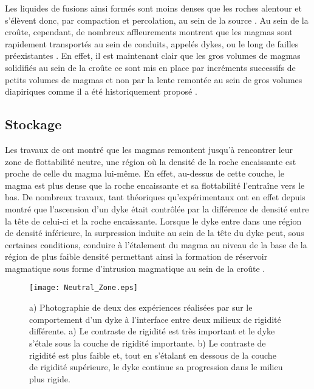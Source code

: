Les liquides de fusions ainsi formés sont moins denses que les roches
alentour et s'élèvent donc, par compaction et percolation, au sein de
la source \citep{McKenzy:1984bo,McKenzie:1985jq}. Au sein de la
croûte, cependant, de nombreux affleurements montrent que les magmas
sont rapidement transportés au sein de conduits, appelés dykes, ou le
long de failles préexistantes
\citep{Clemens:1992kr,Petford:1993bk,Rubin:1995upa,Glazner:2004gv}. En
effet, il est maintenant clair que les gros volumes de magmas
solidifiés au sein de la croûte ce sont mis en place par incréments
successifs de petits volumes de magmas
\citep{Annen:2002er,Glazner:2004gv,Michaut:2011kg} et non par la lente
remontée au sein de gros volumes diapiriques comme il a été
historiquement proposé \citep{Miller:1999km}.


\subsection{Stockage}
\label{C1-sec:stockage}

Les travaux de \citet{Walker:1989jq} ont montré que les magmas
remontent jusqu'à rencontrer leur zone de flottabilité neutre, une
région où la densité de la roche encaissante est proche de celle du
magma lui-même. En effet, au-dessus de cette couche, le magma est plus
dense que la roche encaissante et sa flottabilité l'entraîne vers le
bas. De nombreux travaux, tant théoriques
\citep{Lister:1991ut,Petford:1993bk,Rubin:1995upa} qu'expérimentaux
\citep{Taisne:2009kj,Taisne:2011do} ont en effet depuis montré que
l'ascension d'un dyke était contrôlée par la différence de densité
entre la tête de celui-ci et la roche encaissante. Lorsque le dyke
entre dans une région de densité inférieure, la surpression induite au
sein de la tête du dyke peut, sous certaines conditions, conduire à
l'étalement du magma au niveau de la base de la région de plus faible
densité permettant ainsi la formation de réservoir magmatique sous
forme d'intrusion magmatique au sein de la croûte
\citep{Taisne:2011do}.
\begin{figure}[h!]
 \begin{center}
 \graphicspath{ {/Users/thorey/Documents/These/Manuscript/Figure/Chapter1/} }
 \texttt{[image: Neutral\_Zone.eps]}
 \caption{a) Photographie de deux des expériences réalisées par
 \citet{Kavanagh:2006ig} sur le comportement d'un dyke à
 l'interface entre deux milieux de rigidité différente. a) Le
 contraste de rigidité est très important et le dyke s'étale sous
 la couche de rigidité importante. b) Le contraste de rigidité
 est plus faible et, tout en s'étalant en dessous de la couche de
 rigidité supérieure, le dyke continue sa progression dans le
 milieu plus rigide.}
 \label{C1-Neutral_Zone}
 \end{center}
\end{figure}

